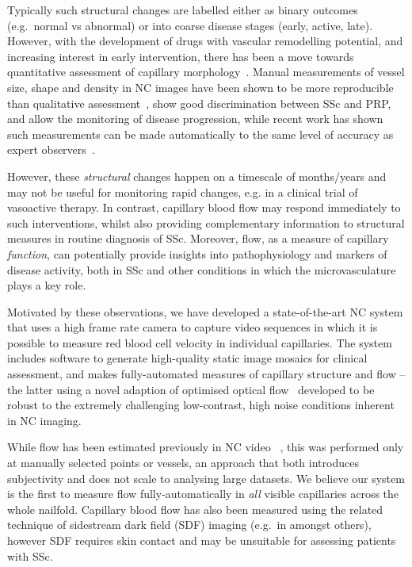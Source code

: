 \documentclass[runningheads,a4paper]{llncs}
\def\eg{e.g.}
\begin{document}
Typically such structural changes are labelled either as binary outcomes (\eg~normal vs abnormal) or into coarse disease stages (early, active, late). However, with the development of drugs with vascular remodelling potential, and increasing interest in early intervention, there has been a move towards quantitative assessment of capillary morphology~\cite{Murray_etal_AR09,Berks_MICCAI14}. Manual measurements of vessel size, shape and density in NC images have been shown to be more reproducible than qualitative assessment~\cite{Murray_etal_AR09}, show good discrimination between SSc and PRP, and allow the monitoring of disease progression, while recent work has shown such measurements can be made automatically to the same level of accuracy as expert observers~\cite{Berks_MICCAI14}.

However, these \textit{structural} changes happen on a timescale of months/years and may not be useful for monitoring rapid changes, e.g. in a clinical trial of vasoactive therapy. In contrast, capillary blood flow may respond immediately to such interventions, whilst also providing complementary information to structural measures in routine diagnosis of SSc. Moreover, flow, as a measure of capillary \textit{function}, can potentially provide insights into pathophysiology and markers of disease activity, both in SSc and other conditions in which the microvasculature plays a key role.%

Motivated by these observations, we have developed a state-of-the-art NC system that uses a high frame rate camera to capture video sequences in which it is possible to measure red blood cell velocity in individual capillaries. The system includes software to generate high-quality static image mosaics for clinical assessment, and makes fully-automated measures of capillary structure and flow -- the latter using a novel adaption of optimised optical flow~\cite{BroxECCV04} developed to be robust to the extremely challenging low-contrast, high noise conditions inherent in NC imaging. 

While flow has been estimated previously in NC video ~\cite{Mawson_Shore_JMET98,Wu_etal_MR09,Shih_etal_MR11}, this was performed only at manually selected points or vessels, an approach that both introduces subjectivity and does not scale to analysing large datasets. We believe our system is the first to measure flow fully-automatically in \textit{all} visible capillaries across the whole nailfold. Capillary blood flow has also been measured using the related technique of sidestream dark field (SDF) imaging (\eg~in \cite{DobbeMBEC08} amongst others), however SDF requires skin contact and may be unsuitable for assessing patients with SSc.
\end{document}
